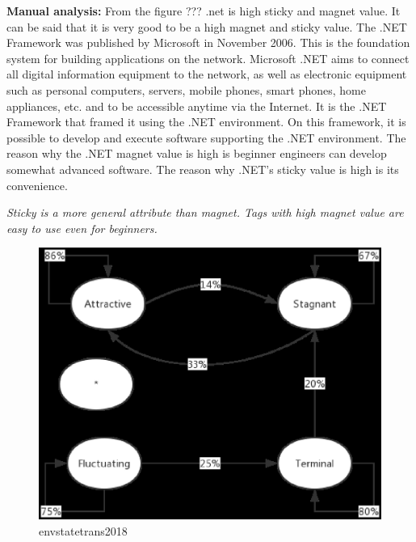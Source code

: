 \documentclass[conference]{IEEEtran}
\begin{document}
\textbf{Manual analysis:}
From the figure ??? .net is high sticky and magnet value. It can be said that it is very good to be a high magnet and sticky value. The .NET Framework was published by Microsoft in November 2006. This is the foundation system for building applications on the network.  Microsoft .NET aims to connect all digital information equipment to the network, as well as electronic equipment such as personal computers, servers, mobile phones, smart phones, home appliances, etc. and to be accessible anytime via the Internet. It is the .NET Framework that framed it using the .NET environment. On this framework, it is possible to develop and execute software supporting the .NET environment. The reason why the .NET magnet value is high is beginner engineers can develop somewhat advanced software. The reason why .NET's sticky value is high is its convenience.
 

 \emph{Sticky is a more general attribute than magnet. Tags with high magnet value are easy to use even for beginners.}

\begin{figure}[t]
 \centering
 \includegraphics[width=.9\hsize]{img/EnvStateTrans2018.eps}  
 \caption{envstatetrans2018} 
 \label{fig:envtrans2018} 
\end{figure}
\end{document}
